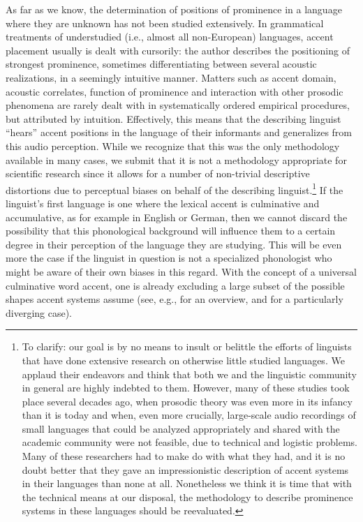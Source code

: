 \documentclass[output=paper]{LSP/langsci}
\begin{document}
As far as we know, the determination of positions of prominence in a language where they are unknown has not been studied extensively. In grammatical treatments of understudied (i.e., almost all non-European) languages, accent placement usually is dealt with cursorily: the author describes the positioning of strong\-est prominence, sometimes differentiating between several acoustic realizations, in a seemingly intuitive manner. Matters such as accent domain, acoustic correlates, function of prominence and interaction with other prosodic phenomena are rarely dealt with in systematically ordered empirical procedures, but attributed by intuition. Effectively, this means that the describing linguist “hears” accent positions in the language of their informants and generalizes from this audio perception. While we recognize that this was the only methodology available in many cases, we submit that it is not a methodology appropriate for scientific research since it allows for a number of non-trivial descriptive distortions due to perceptual biases on behalf of the describing linguist.\footnote{To clarify: our goal is by no means to insult or belittle the efforts of linguists that have done extensive research on otherwise little studied languages. We applaud their endeavors and think that both we and the linguistic community in general are highly indebted to them. However, many of these studies took place several decades ago, when prosodic theory was even more in its infancy than it is today and when, even more crucially, large-scale audio recordings of small languages that could be analyzed appropriately and shared with the academic community were not feasible, due to technical and logistic problems. Many of these researchers had to make do with what they had, and it is no doubt better that they gave an impressionistic description of accent systems in their languages than none at all. Nonetheless we think it is time that with the technical means at our disposal, the methodology to describe prominence systems in these languages should be reevaluated.}  If the linguist’s first language is one where the lexical accent is culminative and accumulative, as for example in English or German, then we cannot discard the possibility that this phonological background will influence them to a certain degree in their perception of the language they are studying. This will be even more the case if the linguist in question is not a specialized phonologist who might be aware of their own biases in this regard. With the concept of a universal culminative word accent, one is already excluding a large subset of the possible shapes accent systems assume (see, e.g., \citealt{Hyman2014} for an overview, and \citealt{Kuegler2012} for a particularly diverging case). 
\end{document}
